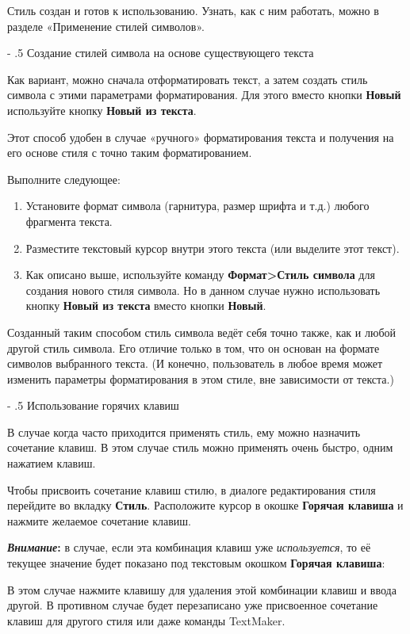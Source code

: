 ﻿\documentclass[a4paper,10pt]{article}
\makeatletter
\renewcommand\paragraph{%
   \@startsection{paragraph}{4}{0mm}%
      {-\baselineskip}%
      {.5\baselineskip}%
      {\normalfont\normalsize\bfseries}}
\makeatother
\begin{document}
Стиль создан и готов к использованию. Узнать, как с ним работать, можно в разделе «Применение стилей символов».

\paragraph{Создание стилей символа на основе существующего текста}

Как вариант, можно сначала отформатировать текст, а затем создать стиль символа с этими параметрами форматирования. Для этого вместо кнопки \textbf{Новый} используйте кнопку \textbf{Новый из текста}.

Этот способ удобен в случае «ручного» форматирования текста и получения на его основе стиля с точно таким форматированием.

Выполните следующее:
\begin{enumerate}
 \item Установите формат символа (гарнитура, размер шрифта и т.д.) любого фрагмента текста.
 \item Разместите текстовый курсор внутри этого текста (или выделите этот текст).
 \item Как описано выше,  используйте команду \textbf{Формат>Стиль символа} для создания нового стиля символа. Но в данном случае нужно использовать кнопку \textbf{Новый из текста} вместо кнопки \textbf{Новый}.
 \end{enumerate}

Созданный таким способом стиль символа ведёт себя точно также, как и любой другой стиль символа. Его отличие только в том, что он основан на формате символов выбранного текста. (И конечно, пользователь в любое время может изменить параметры форматирования в этом стиле, вне зависимости от текста.)

\paragraph{Использование горячих клавиш}

В случае когда часто приходится применять стиль, ему можно назначить сочетание клавиш. В этом случае стиль можно применять очень быстро, одним нажатием клавиш.

Чтобы присвоить сочетание клавиш стилю, в диалоге редактирования стиля перейдите во вкладку \textbf{Стиль}. Расположите курсор в окошке \textbf{Горячая клавиша} и нажмите желаемое сочетание клавиш.

\begin{mdframed}[backgroundcolor=blue!10]
\textbf{\textit{Внимание}:} в случае, если эта комбинация клавиш уже \textit{используется}, то её текущее значение будет показано под текстовым окошком \textbf{Горячая клавиша}:

В этом случае нажмите клавишу  для удаления этой комбинации клавиш и ввода другой. В противном случае будет перезаписано уже присвоенное сочетание клавиш для другого стиля или даже команды TextMaker.
\end{mdframed}
\end{document}
